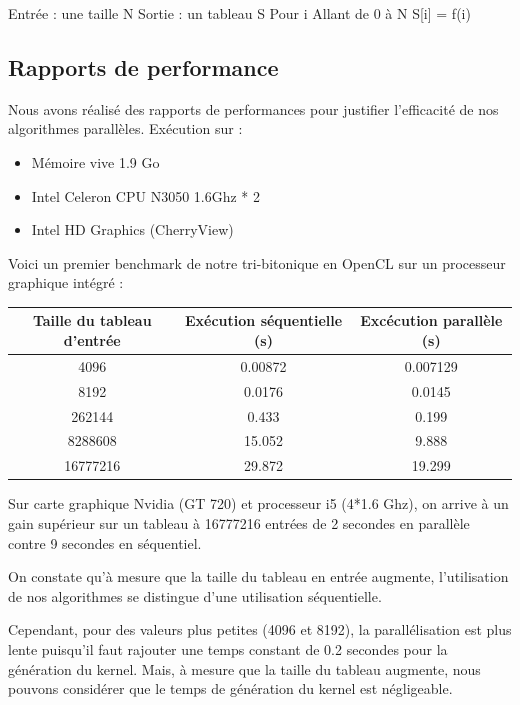 \documentclass{report}
\begin{document}
\begin{enumerate}
\begin{verbatimtab} 
Entrée : une taille N
Sortie : un tableau S
Pour i Allant de 0 à N
    S[i] = f(i)
\end{verbatimtab}

\subsection{Rapports de performance}
Nous avons réalisé des rapports de performances pour justifier l'efficacité de nos algorithmes parallèles.\newline
Exécution sur :
\begin{itemize}
\item Mémoire vive 1.9 Go
\item Intel Celeron CPU N3050 1.6Ghz * 2
\item Intel HD Graphics (CherryView)
\end{itemize}

Voici un premier benchmark de notre tri-bitonique en OpenCL sur un processeur graphique intégré :
\begin{center}
  \begin{tabular}{|*{3}{c|}}
    \hline
    Taille du tableau d'entrée &  Exécution séquentielle (s) & Excécution parallèle (s) \\
    \hline
    4096 &  0.00872 & 0.007129 \\
    \hline
    8192 & 0.0176 & 0.0145 \\
    \hline
    262144 & 0.433 & 0.199 \\
    \hline
    8288608 & 15.052 & 9.888 \\
    \hline
    16777216 & 29.872 & 19.299 \\
    \hline
  \end{tabular}
\end{center}

Sur carte graphique Nvidia (GT 720) et processeur i5 (4*1.6 Ghz), on arrive à un gain supérieur sur un tableau à 16777216 entrées de 2 secondes en parallèle contre 9 secondes en séquentiel.\newline

On constate qu'à mesure que la taille du tableau en entrée augmente, l'utilisation de nos algorithmes se distingue d'une utilisation séquentielle.\newline

Cependant, pour des valeurs plus petites (4096 et 8192), la parallélisation est plus lente puisqu'il faut rajouter une temps constant de 0.2 secondes pour la génération du kernel. Mais, à mesure que la taille du tableau augmente, nous pouvons considérer que le temps de génération du kernel est négligeable.\newline


\end{enumerate}
\end{document}
